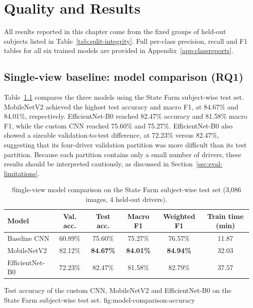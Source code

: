 
\chapter{Quality and Results}
\label{ch:results}

All results reported in this chapter come from the fixed groups of held-out subjects listed in Table~\ref{tab:split-integrity}. Full per-class precision, recall and F1 tables for all six trained models are provided in Appendix~\ref{app:classreports}.

\section{Single-view baseline: model comparison (RQ1)}
\label{sec:qr-baseline}

Table~\ref{tab:model-comparison} compares the three models using the State Farm subject-wise test set. MobileNetV2 achieved the highest test accuracy and macro F1, at 84.67\% and 84.01\%, respectively. EfficientNet-B0 reached 82.47\% accuracy and 81.58\% macro F1, while the custom CNN reached 75.60\% and 75.27\%. EfficientNet-B0 also showed a sizeable validation-to-test difference, at 72.23\% versus 82.47\%, suggesting that its four-driver validation partition was more difficult than its test partition. Because each partition contains only a small number of drivers, these results should be interpreted cautiously, as discussed in Section~\ref{sec:eval-limitations}.

\begin{table}[htbp]
\centering
\caption{Single-view model comparison on the State Farm subject-wise test set (3{,}086 images, 4 held-out drivers).}
\label{tab:model-comparison}
\small
\begin{tabular}{lccccc}
\toprule
\textbf{Model} & \textbf{Val. acc.} & \textbf{Test acc.} & \textbf{Macro F1} & \textbf{Weighted F1} & \textbf{Train time (min)} \\
\midrule
Baseline CNN & 60.89\% & 75.60\% & 75.27\% & 76.57\% & 11.87 \\
MobileNetV2 & 82.12\% & \textbf{84.67\%} & \textbf{84.01\%} & \textbf{84.94\%} & 32.03 \\
EfficientNet-B0 & 72.23\% & 82.47\% & 81.58\% & 82.79\% & 37.57 \\
\bottomrule
\end{tabular}
\end{table}

{Test accuracy of the custom CNN, MobileNetV2 and EfficientNet-B0 on the State Farm subject-wise test set.}
{fig:model-comparison-accuracy}

